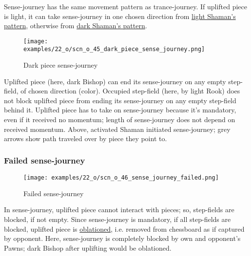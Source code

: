 Sense-journey has the same movement pattern as trance-journey. If uplifted piece
is light, it can take sense-journey in one chosen direction from
\hyperref[fig:scn_cot_082_light_shaman_trance_journey]{light Shaman's pattern},
otherwise from
\hyperref[fig:scn_cot_084_dark_shaman_trance_journey]{dark Shaman's pattern}.

\clearpage %

\vspace*{-2.1\baselineskip}
\noindent
\begin{figure}[!h]
\texttt{[image: examples/22\_o/scn\_o\_45\_dark\_piece\_sense\_journey.png]}
\vspace*{-1.4\baselineskip}
\caption{Dark piece sense-journey}
\label{fig:scn_o_45_dark_piece_sense_journey}
\end{figure}

\vspace*{-0.5\baselineskip}
Uplifted piece (here, dark Bishop) can end its sense-journey on any empty step-field,
of chosen direction (color). Occupied step-field (here, by light Rook) does not block
uplifted piece from ending its sense-journey on any empty step-field behind it.
Uplifted piece has to take on sense-journey because it's mandatory, even if it received
no momentum; length of sense-journey does not depend on received momentum. Above,
activated Shaman initiated sense-journey; grey arrows show path traveled over by
piece they point to.

\clearpage %

\subsubsection*{Failed sense-journey}
\label{sec:One/Starchild/Sense-journey/Failed sense-journey}

\vspace*{-1.4\baselineskip}
\noindent
\begin{figure}[!h]
\texttt{[image: examples/22\_o/scn\_o\_46\_sense\_journey\_failed.png]}
\vspace*{-1.4\baselineskip}
\caption{Failed sense-journey}
\label{fig:scn_o_46_sense_journey_failed}
\end{figure}

\vspace*{-0.5\baselineskip}
In sense-journey, uplifted piece cannot interact with pieces; so, step-fields are
blocked, if not empty. Since sense-journey is mandatory, if all step-fields are
blocked, uplifted piece is \hyperref[sec:Terms/Oblation]{oblationed}, i.e. removed
from chessboard as if captured by opponent.\newline
\indent
Here, sense-journey is completely blocked by own and opponent's Pawns; dark Bishop
after uplifting would be oblationed.

